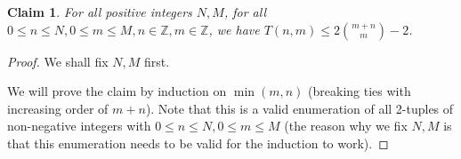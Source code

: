 \documentclass[answers]{exam}
\newtheorem{claim}{Claim}
\begin{document}
\begin{questions}
\begin{parts}
\begin{solution}
\begin{claim}
For all positive integers $N, M$, for all $0 \le n \le N, 0 \le m \le M, n \in \mathbb{Z}, m \in \mathbb{Z}$, we have $T(n, m) \leq 2\binom{m+n}{m} - 2$.
\end{claim}
\begin{proof}

We shall fix $N, M$ first. 

We will prove the claim by induction on $\min(m, n)$ (breaking ties with increasing order of $m + n$). Note that this is a valid enumeration of all 2-tuples of non-negative integers with $0 \le n \le N, 0 \le m \le M$ (the reason why we fix $N, M$ is that this enumeration needs to be valid for the induction to work).



\end{proof}
\end{solution}
\end{parts}
\end{questions}
\end{document}
